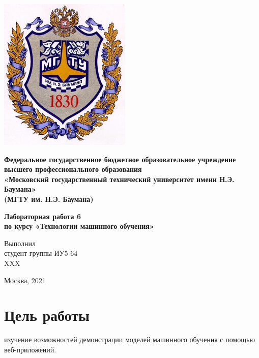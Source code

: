 \documentclass[a4paper]{article}
\begin{document}
  \fontsize{14}{16}\selectfont

  \begin{titlepage}
    \begin{minipage}{0.2\textwidth}
      \includegraphics[scale=0.4]{logo}
    \end{minipage}
    \begin{minipage}{0.7\textwidth}\centering
      \fontsize{10}{12}\selectfont
      \textbf{
        Федеральное государственное бюджетное образовательное учреждение \\
        высшего профессионального образования \\
        «Московский государственный технический университет имени Н.Э. Баумана» \\
        (МГТУ им. Н.Э. Баумана)
      }
    \end{minipage}

    \vspace{5cm}
    \centering
    \textbf{
      Лабораторная работа 6 \\
      по курсу «Технологии машинного обучения» \\
    }

    \vspace{5cm}
    \begin{flushright}
    Выполнил \\
    студент группы ИУ5-64 \\
    XXX
    \end{flushright}
    \vspace*{\fill}
    Москва, 2021
  \end{titlepage}

  \section*{Цель работы}
  изучение возможностей демонстрации моделей машинного обучения с помощью веб-приложений.
\end{document}
